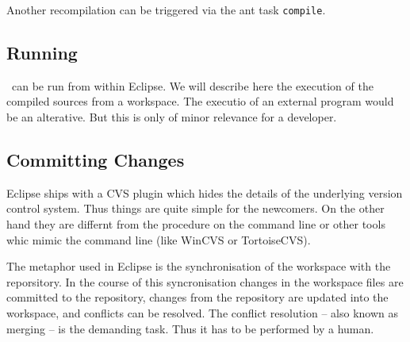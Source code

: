 \documentclass{extex-doc}
\begin{document}
Another recompilation can be triggered via the ant task \texttt{compile}.

\subsection{Running \ExTeX}

\ExTeX\ can be run from within Eclipse. We will describe here the
execution of the compiled sources from a workspace. The executio of an
external program would be an alterative. But this is only of minor
relevance for a developer.

\INCOMPLETE

\subsection{Committing Changes}

Eclipse ships with a CVS plugin which hides the details of the
underlying version control system. Thus things are quite simple for
the newcomers. On the other hand they are differnt from the procedure
on the command line or other tools whic mimic the command line (like
WinCVS or TortoiseCVS).

The metaphor used in Eclipse is the synchronisation of the workspace
with the reporsitory. In the course of this syncronisation changes in
the workspace files are committed to the repository, changes from the
repository are updated into the workspace, and conflicts can be
resolved. The conflict resolution -- also known as merging -- is the
demanding task. Thus it has to be performed by a human.
\end{document}
